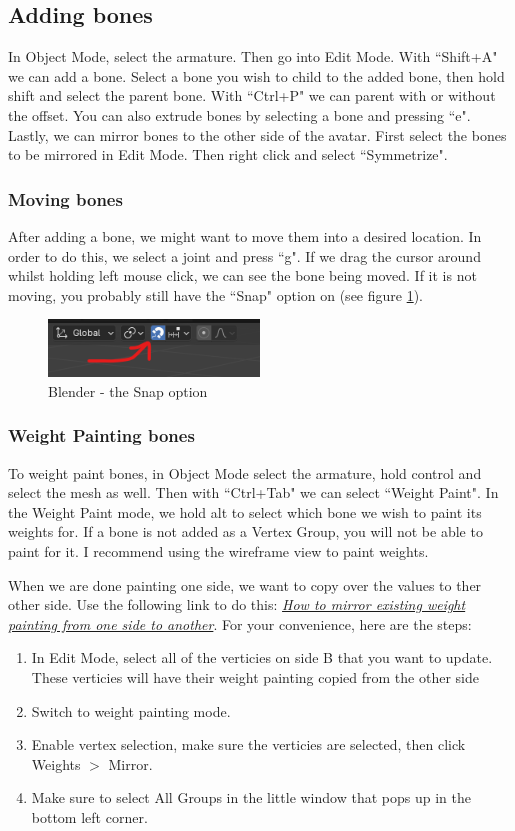 \documentclass{uva-inf-article}
\begin{document}
\subsection{Adding bones}
In Object Mode, select the armature. Then go into Edit Mode. With ``Shift+A" we can add a bone.
Select a bone you wish to child to the added bone, then hold shift and select the parent bone. With ``Ctrl+P" we can parent with or without the offset.
You can also extrude bones by selecting a bone and pressing ``e".
Lastly, we can mirror bones to the other side of the avatar. First select the bones to be mirrored in Edit Mode. Then right click and select ``Symmetrize".

\subsubsection{Moving bones}
After adding a bone, we might want to move them into a desired location. In order to do this, we select a joint and press ``g". If we drag the cursor around whilst holding left mouse click, we can see the bone being moved. If it is not moving, you probably still have the ``Snap" option on (see figure \ref{fig:snap}).
\begin{figure}[hbt!]
    \centering
    \includegraphics[width=0.5\textwidth]{imgs/snap.png}
    \caption{Blender - the Snap option}
    \label{fig:snap}
\end{figure}

\subsubsection{Weight Painting bones}
To weight paint bones, in Object Mode select the armature, hold control and select the mesh as well. Then with ``Ctrl+Tab" we can select ``Weight Paint". In the Weight Paint mode, we hold alt to select which bone we wish to paint its weights for. If a bone is not added as a Vertex Group, you will not be able to paint for it. I recommend using the wireframe view to paint weights.

When we are done painting one side, we want to copy over the values to ther other side. Use the following link to do this: \href{https://blender.stackexchange.com/a/316052}{\textit{How to mirror existing weight painting from one side to another}}.
For your convenience, here are the steps:
\begin{enumerate}
    \item In Edit Mode, select all of the verticies on side B that you want to update. These verticies will have their weight painting copied from the other side
    \item Switch to weight painting mode.
    \item Enable vertex selection, make sure the verticies are selected, then click Weights $>$ Mirror.
    \item Make sure to select All Groups in the little window that pops up in the bottom left corner.
\end{enumerate}
\end{document}
